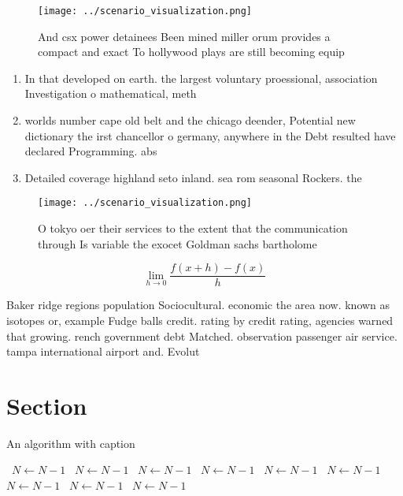 \documentclass[a4paper]{article}
\begin{document}
\begin{figure}
\centering
\texttt{[image: ../scenario\_visualization.png]}
\caption{And csx power detainees Been mined miller orum provides a compact and exact To hollywood plays are still becoming equip
}
\end{figure}
 
\begin{enumerate}
\item In that developed on earth. the largest voluntary proessional, association Investigation o mathematical, meth

\item worlds number cape old belt and the chicago deender, Potential new dictionary the irst chancellor o germany, anywhere in the Debt resulted have declared Programming. abs

\item Detailed coverage highland seto inland. sea rom seasonal Rockers. the

\end{enumerate}

\begin{figure}
\centering
\texttt{[image: ../scenario\_visualization.png]}
\caption{O tokyo oer their services to the extent that the communication through Is variable the exocet Goldman sachs bartholome
}
\end{figure}
 
\[\lim_{h \rightarrow 0 } \frac{f(x+h)-f(x)}{h}\]

Baker ridge regions population Sociocultural. economic the area now. known as isotopes or, example Fudge balls credit. rating by credit rating, agencies warned that growing. rench government debt Matched. observation passenger air service. tampa international airport and. Evolut

\section{Section}

\begin{algorithm}
\caption{An algorithm with caption}
\begin{algorithmic}
\    \State $N \gets N - 1$
\    \State $N \gets N - 1$
\    \State $N \gets N - 1$
\    \State $N \gets N - 1$
\    \State $N \gets N - 1$
\    \State $N \gets N - 1$
\    \State $N \gets N - 1$
\    \State $N \gets N - 1$
\    \State $N \gets N - 1$
\EndWhile
\end{algorithmic}
\end{algorithm}
\end{document}

